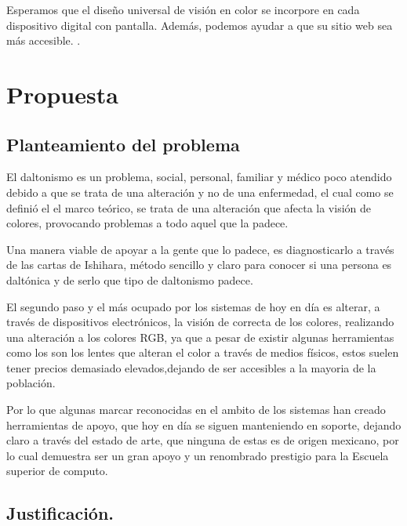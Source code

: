 \documentclass[10pt]{article}
\begin{document}
\setlength{\parskip}{2mm}

Esperamos que el diseño universal de visión en color se incorpore en cada dispositivo digital con pantalla. Además, podemos ayudar a que su sitio web sea más accesible.
\cite{IEEEreferencias:Ref20}.

\newpage
\section{Propuesta}

\subsection{Planteamiento del problema}

El daltonismo es un problema, social, personal, familiar y médico poco atendido debido a que se trata de una alteración y no de una enfermedad, el cual como se definió el el marco teórico, se trata de una alteración que afecta la visión de colores, provocando problemas a todo aquel que la padece.

\setlength{\parskip}{2mm}

Una manera viable de apoyar a la gente que lo padece, es diagnosticarlo a través de las cartas de Ishihara, método sencillo y claro para conocer si una persona es daltónica y de serlo que tipo de daltonismo padece.

\setlength{\parskip}{2mm}

El segundo paso y el más ocupado por los sistemas de hoy en día es alterar, a través de dispositivos electrónicos, la visión de correcta de los colores, realizando una alteración a los colores RGB, ya que a pesar de existir algunas herramientas como los son los lentes que alteran el color a través de medios físicos, estos suelen tener precios demasiado elevados,dejando de ser accesibles a la mayoria de la población.

Por lo que algunas marcar reconocidas en el ambito de los sistemas han creado herramientas de apoyo, que hoy en día se siguen manteniendo en soporte, dejando claro a través del estado de arte, que ninguna de estas es de origen mexicano, por lo cual demuestra ser un gran apoyo y un renombrado prestigio para la Escuela superior de computo.

\subsection{Justificación.}
\end{document}
